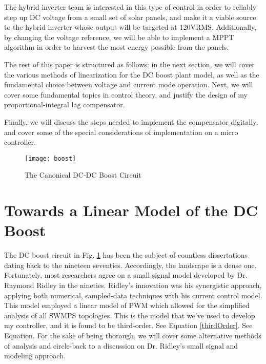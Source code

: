 The hybrid inverter team is interested in this type of control in order to reliably step up DC voltage from a small set of solar panels, and make it a viable source to the hybrid inverter whose output will be targeted at 120VRMS.
Additionally, by changing the voltage reference, we will be able to implement a MPPT algorithm in order to harvest the most energy possible from the panels.

The rest of this paper is structured as follows: in the next section, we will cover the various methods of linearization for the DC boost plant model, as well as the fundamental choice between voltage and current mode operation. Next, we will cover some fundamental topics in control theory, and justify the design of my proportional-integral lag compensator. 

Finally, we will discuss the steps needed to implement the compensator digitally, and cover some of the special considerations of implementation on a micro controller.  

\begin{figure}[htbp]
\begin{center}
\texttt{[image: boost]}
\caption{The Canonical DC-DC Boost Circuit}
\label{boost}
\end{center}
\end{figure}


\section{Towards a Linear Model of the DC Boost}

The DC boost circuit in Fig. \ref{boost} has been the subject of countless dissertations dating back to the nineteen seventies. Accordingly, the landscape is a dense one. Fortunately, most researchers agree on a small signal model developed by Dr. Raymond Ridley in the nineties. Ridley's innovation was his synergistic approach, applying both numerical, sampled-data techniques with his current control model. This model employed a linear model of PWM which allowed for the simplified analysis of all SWMPS topologies. This is the model that we've used to develop my controller, and it is found to be third-order. See Equation \ref{thirdOrder}. See Equation. For the sake of being thorough, we will cover some alternative methods of analysis and circle-back to a discussion on Dr. Ridley's small signal and modeling approach.

